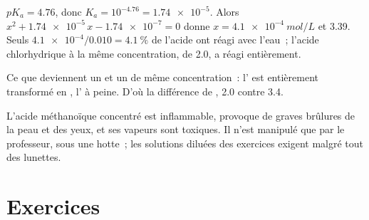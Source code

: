 \begin{example}\label{ex:g12:ka-and-pka:acetic}
$pK_a = 4.76$, donc $K_a = 10^{-4.76} = \num{1.74e-5}$. Alors
$x^2 + \num{1.74e-5}\,x - \num{1.74e-7} = 0$ donne
$x = \qty{4.1e-4}{mol/L}$ et  3.39. Seuls $\num{4.1e-4}/0.010 =
\qty{4.1}{\percent}$ de l'acide ont réagi avec l'eau~; l'acide
chlorhydrique à la même concentration, de  2.0, a réagi entièrement.
\end{example}

\begin{omfigure}

{\small Ce que deviennent un  et un  de même
concentration~: l' est entièrement transformé en , l' à peine. D'où la différence de , 2.0 contre 3.4.}
\end{omfigure}

\begin{safety}{}
L'acide méthanoïque concentré est inflammable, provoque de graves
brûlures de la peau et des yeux, et ses vapeurs sont toxiques. Il n'est
manipulé que par le professeur, sous une hotte~; les solutions diluées
des exercices exigent malgré tout des lunettes.
\end{safety}

\section{Exercices}

